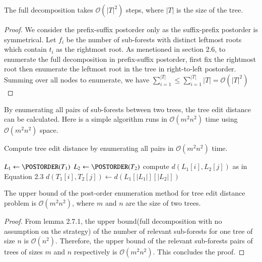 \begin{lemma} The full decomposition takes $\mathcal{O}(\left\vert T \right\vert ^ {2})$ steps, where $\left\vert T \right\vert$ is the size of the tree.
\end{lemma} 
\begin{proof}
We consider the prefix-suffix postorder only as the suffix-prefix postorder is symmetrical. 
Let $f_{i}$ be the number of sub-forests with distinct leftmost roots which contain $t_i$ as the rightmost root. As menetioned in section 2.6, to enumerate the full decomposition in prefix-suffix postorder, first fix the rightmost root then enumerate the leftmost root in the tree in right-to-left postorder. Summing over all nodes to enumerate, we have $\sum_{i=1}^{\left\vert T \right\vert} \leq \sum_{i=1}^{\left\vert T \right\vert} \left\vert T \right\vert = \mathcal{O}(\left\vert T \right\vert^{2})$
\end{proof}

By enumerating all pairs of sub-forests between two trees, the tree edit distance can be calculated.  Here is a simple algorithm runs in $\mathcal{O}(m^2n^2)$ time using $\mathcal{O}(m^2n^2)$ space.

\IncMargin{1em}
\begin{algorithm}
  \caption{Compute tree edit distance by enumerating all pairs in $\mathcal{O}(m^2n^2)$ time.}

    $L_1 \gets \POSTORDER(T_1)$\;
    $L_2 \gets \POSTORDER(T_2)$\;
     {
		 {
			compute $d(L_1[i], L_2[j])$ as in Equation 2.3
		}    
    }
    $d(T_1[i], T_2[j]) \gets d(L_1[\left\vert L_1 \right\vert][\left\vert L_2 \right\vert])$\;
    \;
\end{algorithm}
\DecMargin{1em}

\begin{lemma}
The upper bound of the post-order enumeration method for tree edit distance problem is $\mathcal{O}(m^2n^2)$, where $m$ and $n$ are the size of two trees.
\end{lemma}
\begin{proof}
From lemma 2.7.1, the upper bound(full decomposition with no assumption on the strategy) of the number of relevant sub-forests for one tree of size $n$ is $\mathcal{O}(n^2)$. Therefore, the upper bound of the relevant sub-forests pairs of trees of sizes $m$ and $n$ respectively is $\mathcal{O}(m^2n^2)$. This concludes the proof.
\end{proof}

